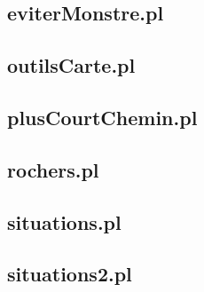 \documentclass[a4paper,11pt]{article}
\begin{document}
\newpage
\subsection{eviterMonstre.pl}


\newpage
\subsection{outilsCarte.pl}


\newpage
\subsection{plusCourtChemin.pl}


\newpage
\subsection{rochers.pl}


\newpage
\subsection{situations.pl}


\newpage
\subsection{situations2.pl}


\newpage
\tableofcontents
\end{document}
